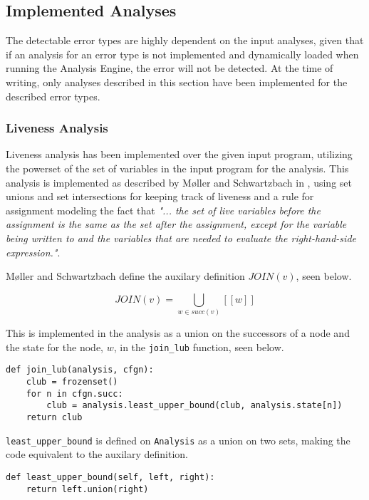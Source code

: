 \subsection{Implemented Analyses}

The detectable error types are highly dependent on the input analyses, given that if an analysis for an error type is not implemented and dynamically loaded when running the Analysis Engine, the error will not be detected. At the time of writing, only analyses described in this section have been implemented for the described error types. 

\subsubsection{Liveness Analysis}
Liveness analysis has been implemented over the given input program, utilizing the powerset of the set of variables in the input program for the analysis. 
This analysis is implemented as described by Møller and Schwartzbach in \cite{spa}, using set unions and set intersections for keeping track of liveness and a rule for assignment modeling the fact that \textit{"... the set of live variables before the assignment is the same as the set after the assignment, except for the variable being written to and the variables that are needed to evaluate the right-hand-side expression."}. 

\newpar Møller and Schwartzbach define the auxilary definition $JOIN(v)$, seen below. 

\begin{equation*}
    J O I N (v) = \mathop{{\bigcup}}_{w \in succ(v)} [[w]]
\end{equation*}

\noindent This is implemented in the analysis as a union on the successors of a node and the state for the node, $w$, in the \texttt{join\_lub} function, seen below. 

\begin{verbatim}
def join_lub(analysis, cfgn):
    club = frozenset()
    for n in cfgn.succ:
        club = analysis.least_upper_bound(club, analysis.state[n])
    return club
\end{verbatim}

\noindent \texttt{least\_upper\_bound} is defined on \texttt{Analysis} as a union on two sets, making the code equivalent to the auxilary definition. 

\begin{verbatim}
def least_upper_bound(self, left, right):
    return left.union(right)
\end{verbatim}

